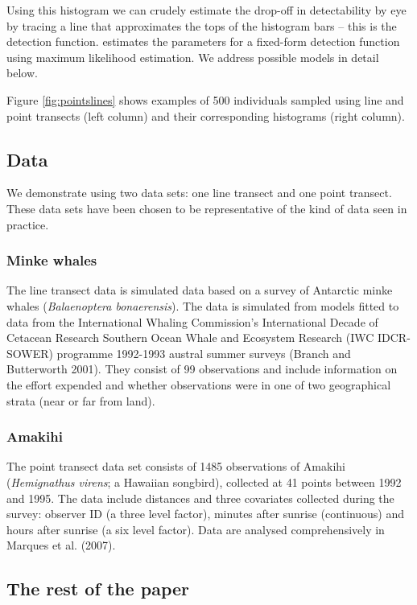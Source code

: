 \documentclass[article]{jss}
\begin{document}
Using this histogram we can crudely estimate the drop-off in
detectability by eye by tracing a line that approximates the tops of the
histogram bars -- this is the detection function. 
estimates the parameters for a fixed-form detection function using
maximum likelihood estimation. We address possible models in detail
below.

Figure \ref{fig:pointslines} shows examples of 500 individuals sampled
using line and point transects (left column) and their corresponding
histograms (right column).

\subsection{Data}\label{data}

We demonstrate  using two data sets: one line transect and
one point transect. These data sets have been chosen to be
representative of the kind of data seen in practice.

\subsubsection{Minke whales}\label{minke-whales}

The line transect data is simulated data based on a survey of Antarctic
minke whales (\emph{Balaenoptera bonaerensis}). The data is simulated
from models fitted to data from the International Whaling Commission's
International Decade of Cetacean Research Southern Ocean Whale and
Ecosystem Research (IWC IDCR-SOWER) programme 1992-1993 austral summer
surveys (Branch and Butterworth 2001). They consist of 99 observations
and include information on the effort expended and whether observations
were in one of two geographical strata (near or far from land).

\subsubsection{Amakihi}\label{amakihi}

The point transect data set consists of 1485 observations of Amakihi
(\emph{Hemignathus virens}; a Hawaiian songbird), collected at 41 points
between 1992 and 1995. The data include distances and three covariates
collected during the survey: observer ID (a three level factor), minutes
after sunrise (continuous) and hours after sunrise (a six level factor).
Data are analysed comprehensively in Marques et al. (2007).

\subsection{The rest of the paper}\label{the-rest-of-the-paper}
\end{document}
